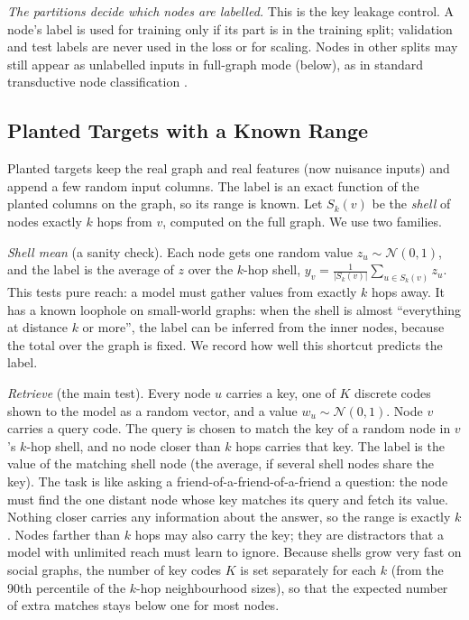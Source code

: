 \textit{The partitions decide which nodes are labelled.} This is the key leakage control. A node's label is used for training only if its part is in the training split; validation and test labels are never used in the loss or for scaling. Nodes in other splits may still appear as unlabelled inputs in full-graph mode (below), as in standard transductive node classification \citep{kipf2017}.

\subsection{Planted Targets with a Known Range}
Planted targets keep the real graph and real features (now nuisance inputs) and append a few random input columns. The label is an exact function of the planted columns on the graph, so its range is known. Let $S_k(v)$ be the \emph{shell} of nodes exactly $k$ hops from $v$, computed on the full graph. We use two families.

\textit{Shell mean} (a sanity check). Each node gets one random value $z_u\sim\mathcal N(0,1)$, and the label is the average of $z$ over the $k$-hop shell, $y_v=\frac{1}{|S_k(v)|}\sum_{u\in S_k(v)} z_u$. This tests pure reach: a model must gather values from exactly $k$ hops away. It has a known loophole on small-world graphs: when the shell is almost ``everything at distance $k$ or more'', the label can be inferred from the inner nodes, because the total over the graph is fixed. We record how well this shortcut predicts the label.

\textit{Retrieve} (the main test). Every node $u$ carries a key, one of $K$ discrete codes shown to the model as a random vector, and a value $w_u\sim\mathcal N(0,1)$. Node $v$ carries a query code. The query is chosen to match the key of a random node in $v$'s $k$-hop shell, and no node closer than $k$ hops carries that key. The label is the value of the matching shell node (the average, if several shell nodes share the key). The task is like asking a friend-of-a-friend-of-a-friend a question: the node must find the one distant node whose key matches its query and fetch its value. Nothing closer carries any information about the answer, so the range is exactly $k$. Nodes farther than $k$ hops may also carry the key; they are distractors that a model with unlimited reach must learn to ignore. Because shells grow very fast on social graphs, the number of key codes $K$ is set separately for each $k$ (from the 90th percentile of the $k$-hop neighbourhood sizes), so that the expected number of extra matches stays below one for most nodes.


